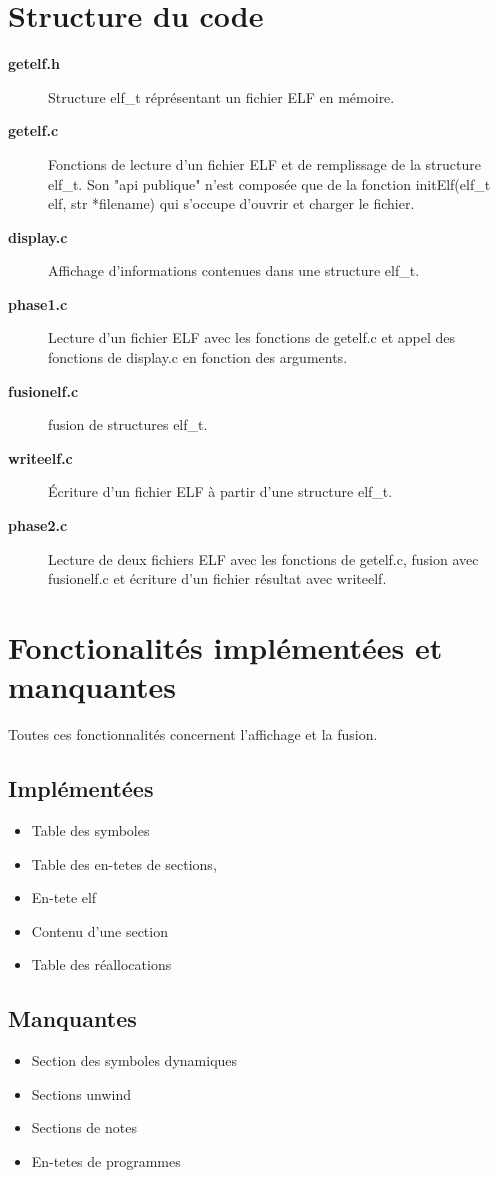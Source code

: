 \documentclass[10pt,twoside]{article}   %
\begin{document}
\section{Structure du code}
	\begin{description}
	\item [\bf{getelf.h}] Structure elf\_t réprésentant un fichier ELF en mémoire.
	\item [\bf{getelf.c}] Fonctions de lecture d'un fichier ELF et de remplissage de la structure elf\_t. Son "api publique" n'est composée que de la fonction initElf(elf\_t elf, str *filename) qui s'occupe d'ouvrir et charger le fichier.
	\item [\bf{display.c}] Affichage d'informations contenues dans une structure elf\_t.
	\item [\bf{phase1.c}] Lecture d'un fichier ELF avec les fonctions de getelf.c et appel des fonctions de display.c en fonction des arguments.
	\item [\bf{fusionelf.c}] fusion de structures elf\_t.
	\item [\bf{writeelf.c}] Écriture d'un fichier ELF à partir d'une structure elf\_t.
	\item [\bf{phase2.c}] Lecture de deux fichiers ELF avec les fonctions de getelf.c, fusion avec fusionelf.c et écriture d'un fichier résultat avec writeelf.
	\end{description}


\section{Fonctionalités implémentées et manquantes}
	Toutes ces fonctionnalités concernent l'affichage et la fusion.
	\subsection{Implémentées}
		\begin{itemize}
			\item Table des symboles
			\item Table des en-tetes de sections,
			\item En-tete elf
			\item Contenu d'une section
			\item Table des réallocations
		\end{itemize}
	\subsection{Manquantes}
		\begin{itemize}
			\item Section des symboles dynamiques
			\item Sections unwind
			\item Sections de notes
			\item En-tetes de programmes
		\end{itemize}
\end{document}
